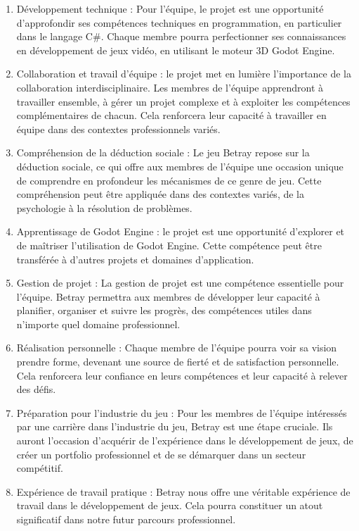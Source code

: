 \documentclass[
	article,			%
	11pt,				%
	oneside,			%
	a4paper,			%
	chapter=TITLE,
	french,			%
	sumario=tradicional
	]{base_nt}
\begin{document}
\begin{enumerate}
    \item Développement technique : Pour l'équipe, le projet est une opportunité d'approfondir ses compétences techniques en programmation, en particulier dans le langage C\#. Chaque membre pourra perfectionner ses connaissances en développement de jeux vidéo, en utilisant le moteur 3D Godot Engine.

    \item Collaboration et travail d'équipe : le projet met en lumière l'importance de la collaboration interdisciplinaire. Les membres de l'équipe apprendront à travailler ensemble, à gérer un projet complexe et à exploiter les compétences complémentaires de chacun. Cela renforcera leur capacité à travailler en équipe dans des contextes professionnels variés.

    \item Compréhension de la déduction sociale : Le jeu Betray repose sur la déduction sociale, ce qui offre aux membres de l'équipe une occasion unique de comprendre en profondeur les mécanismes de ce genre de jeu. Cette compréhension peut être appliquée dans des contextes variés, de la psychologie à la résolution de problèmes.

    \item Apprentissage de Godot Engine : le projet est une opportunité d'explorer et de maîtriser l'utilisation de Godot Engine. Cette compétence peut être transférée à d'autres projets et domaines d'application.

    \item Gestion de projet : La gestion de projet est une compétence essentielle pour l'équipe. Betray permettra aux membres de développer leur capacité à planifier, organiser et suivre les progrès, des compétences utiles dans n'importe quel domaine professionnel.

    \item Réalisation personnelle : Chaque membre de l'équipe pourra voir sa vision prendre forme, devenant une source de fierté et de satisfaction personnelle. Cela renforcera leur confiance en leurs compétences et leur capacité à relever des défis.

    \item Préparation pour l'industrie du jeu : Pour les membres de l'équipe intéressés par une carrière dans l'industrie du jeu, Betray est une étape cruciale. Ils auront l'occasion d'acquérir de l'expérience dans le développement de jeux, de créer un portfolio professionnel et de se démarquer dans un secteur compétitif.

    \item Expérience de travail pratique : Betray nous offre une véritable expérience de travail dans le développement de jeux. Cela pourra constituer un atout significatif dans notre futur parcours professionnel.
\end{enumerate}
\end{document}
